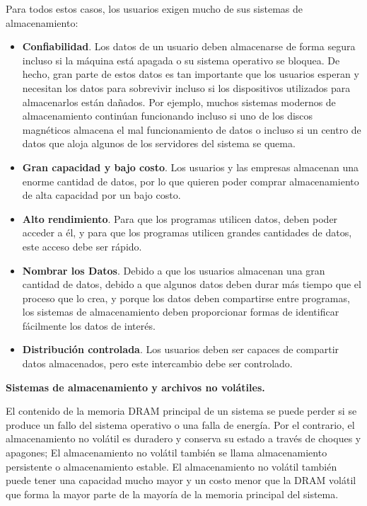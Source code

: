 \documentclass[10pt]{book}
\begin{document}
Para todos estos casos, los usuarios exigen mucho de sus sistemas de almacenamiento:
\begin{itemize}
\item \textbf{Confiabilidad}. Los datos de un usuario deben almacenarse de forma segura incluso si la máquina está apagada o su sistema operativo se bloquea. De hecho, gran parte de estos datos es tan importante que los usuarios esperan y necesitan los datos para sobrevivir incluso si los dispositivos utilizados para almacenarlos están dañados. Por ejemplo, muchos sistemas modernos de almacenamiento continúan funcionando incluso si uno de los discos magnéticos almacena el mal funcionamiento de datos o incluso si un centro de datos que aloja algunos de los servidores del sistema se quema.

\item \textbf{Gran capacidad y bajo costo}. Los usuarios y las empresas almacenan una enorme cantidad de datos, por lo que quieren poder comprar almacenamiento de alta capacidad por un bajo costo.

\item \textbf{Alto rendimiento}. Para que los programas utilicen datos, deben poder acceder a él, y para que los programas utilicen grandes cantidades de datos, este acceso debe ser rápido.

\item \textbf{Nombrar los Datos}. Debido a que los usuarios almacenan una gran cantidad de datos, debido a que algunos datos deben durar más tiempo que el proceso que lo crea, y porque los datos deben compartirse entre programas, los sistemas de almacenamiento deben proporcionar formas de identificar fácilmente los datos de interés. 

\item \textbf{Distribución controlada}. Los usuarios deben ser capaces de compartir datos almacenados, pero este intercambio debe ser controlado.
\end{itemize}

\textbf{Sistemas de almacenamiento y archivos no volátiles.}

El contenido de la memoria DRAM principal de un sistema se puede perder si se produce un fallo del sistema operativo o una falla de energía. Por el contrario, el almacenamiento no volátil es duradero y conserva su estado a través de choques y apagones; El almacenamiento no volátil también se llama almacenamiento persistente o almacenamiento estable. El almacenamiento no volátil también puede tener una capacidad mucho mayor y un costo menor que la DRAM volátil que forma la mayor parte de la mayoría de la memoria principal del sistema.
\end{document}
